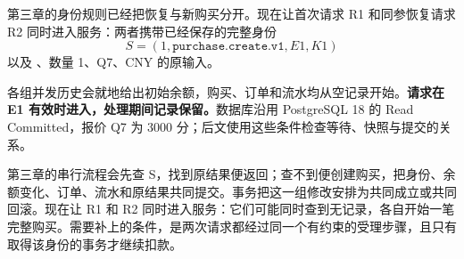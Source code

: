 第三章的身份规则已经把恢复与新购买分开。现在让首次请求 R1 和同参恢复请求 R2 同时进入服务：两者携带已经保存的完整身份
\[
 S=(1,\texttt{purchase.create.v1},E1,K1)
\]
以及 、数量 1、Q7、CNY 的原输入。

各组并发历史会就地给出初始余额，购买、订单和流水均从空记录开始。\textbf{请求在 E1 有效时进入，处理期间记录保留。}数据库沿用 PostgreSQL 18 的 Read Committed，报价 Q7 为 3000 分；后文使用这些条件检查等待、快照与提交的关系。

第三章的串行流程会先查 S，找到原结果便返回；查不到便创建购买，把身份、余额变化、订单、流水和原结果共同提交。事务把这一组修改安排为共同成立或共同回滚。现在让 R1 和 R2 同时进入服务：它们可能同时查到无记录，各自开始一笔完整购买。需要补上的条件，是两次请求都经过同一个有约束的受理步骤，且只有取得该身份的事务才继续扣款。
